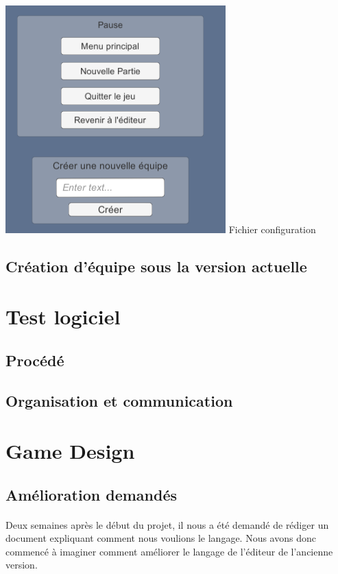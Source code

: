 \documentclass{report}
\begin{document}
\paragraph{}
\begin{center}
\includegraphics[scale=1]{DATA/oldPause.png}
 {Fichier configuration}
\end{center}
\paragraph{}

\subsection{Création d’équipe sous la version actuelle}
\section{Test logiciel}
\subsection{Procédé}
\subsection{Organisation et communication}
\section{Game Design}
\newpage
\subsection{Amélioration demandés}
\paragraph{}
  Deux semaines après le début du projet, il nous a été demandé de rédiger un document expliquant comment nous voulions le langage. Nous avons donc commencé à imaginer comment améliorer le langage de l’éditeur de l’ancienne version.
\end{document}
